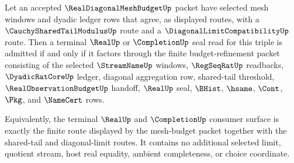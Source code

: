 \begin{theorem}
\label{thm:real-diagonal-mesh-budget-terminal-route-readback}
Let an accepted $\RealDiagonalMeshBudgetUp$ packet have selected mesh windows and dyadic ledger rows that agree, as displayed routes, with a $\CauchySharedTailModulusUp$ route and a $\DiagonalLimitCompatibilityUp$ route. Then a terminal $\RealUp$ or $\CompletionUp$ seal read for this triple is admitted if and only if it factors through the finite budget-refinement packet consisting of the selected $\StreamNameUp$ windows, $\RegSeqRatUp$ readbacks, $\DyadicRatCoreUp$ ledger, diagonal aggregation row, shared-tail threshold, $\RealObservationBudgetUp$ handoff, $\RealUp$ seal, $\BHist$, $\hsame$, $\Cont$, $\Pkg$, and $\NameCert$ rows.

Equivalently, the terminal $\RealUp$ and $\CompletionUp$ consumer surface is exactly the finite route displayed by the mesh-budget packet together with the shared-tail and diagonal-limit routes. It contains no additional selected limit, quotient stream, host real equality, ambient completeness, or choice coordinate.
\end{theorem}
